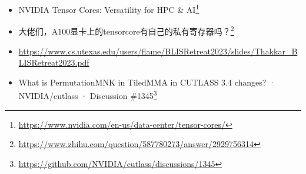\begin{itemize}
  \item NVIDIA Tensor Cores: Versatility for HPC \& AI\footnote{\url{https://www.nvidia.com/en-us/data-center/tensor-cores/}}
  \item 大佬们，A100显卡上的tensorcore有自己的私有寄存器吗？\footnote{\url{https://www.zhihu.com/question/587780273/answer/2929756314}}
  \item \url{https://www.cs.utexas.edu/users/flame/BLISRetreat2023/slides/Thakkar_BLISRetreat2023.pdf}
  \item [QST] What is PermutationMNK in TiledMMA in CUTLASS 3.4 changes? · NVIDIA/cutlass · Discussion \#1345\footnote{\url{https://github.com/NVIDIA/cutlass/discussions/1345}}
\end{itemize}
